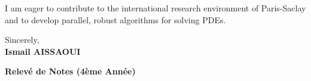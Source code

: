 \documentclass[a4paper,11pt]{article}
\begin{document}
I am eager to contribute to the international research environment of Paris-Saclay and to develop parallel, robust algorithms for solving PDEs.

\bigskip
Sincerely, \\
\textbf{Ismail AISSAOUI}

\newpage

\begin{center}
    {\Large\bfseries Relevé de Notes (4ème Année)}\\[20pt]
\end{center}


\end{document}
